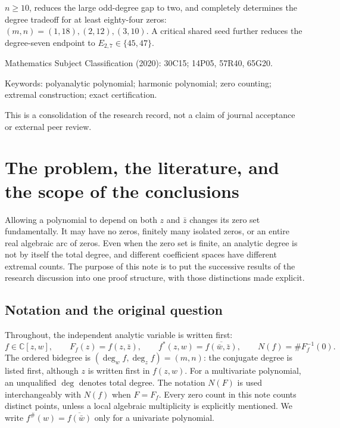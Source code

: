 \documentclass[UTF8,11pt]{ctexart}
\theoremstyle{definition}
\numberwithin{equation}{section}
\newcommand{\C}{\mathbb C}\newcommand{\R}{\mathbb R}
\begin{document}
\begin{titlepage}
\begin{tcolorbox}[colback=MidnightBlue!4,colframe=MidnightBlue!50,sharp corners,boxrule=0.5pt,width=0.94\textwidth,fontupper=\small]
$n\ge10$, reduces the large odd-degree gap to two,
and completely determines the degree tradeoff for at least
eighty-four zeros: $(m,n)=(1,18),(2,12),(3,10)$.
A critical shared seed further reduces the degree-seven
endpoint to $E_{2,7}\in\{45,47\}$.
\end{tcolorbox}
\vspace{0.6cm}
{\small Mathematics Subject Classification (2020): 30C15; 14P05, 57R40, 65G20.\par}
{\small Keywords: polyanalytic polynomial; harmonic polynomial; zero counting; extremal construction; exact certification.\par}
\vfill
{\small This is a consolidation of the research record, not a claim of journal acceptance or external peer review.\par}
\end{titlepage}
\begingroup\small\setlength{\parskip}{0pt}\linespread{0.93}\selectfont\tableofcontents\endgroup
\newpage
\section{The problem, the literature, and the scope of the conclusions}\label{sec:intro}

Allowing a polynomial to depend on both $z$ and $\bar z$ changes its zero set fundamentally. It may have no zeros, finitely many isolated zeros, or an entire real algebraic arc of zeros. Even when the zero set is finite, an analytic degree is not by itself the total degree, and different coefficient spaces have different extremal counts. The purpose of this note is to put the successive results of the research discussion into one proof structure, with those distinctions made explicit.

\subsection{Notation and the original question}\label{sec:notation}
Throughout, the independent analytic variable is written first:
\[
 f\in\C[z,w],\qquad F_f(z)=f(z,\bar z),\qquad
 f^*(z,w)=\overline{f(\bar w,\bar z)},\qquad N(f)=\#F_f^{-1}(0).
\]
The ordered bidegree is $(\deg_w f,\deg_z f)=(m,n)$: the conjugate degree is listed first, although $z$ is written first in $f(z,w)$. For a multivariate polynomial, an unqualified $\deg$ denotes total degree. The notation $N(F)$ is used interchangeably with $N(f)$ when $F=F_f$. Every zero count in this note counts distinct points, unless a local algebraic multiplicity is explicitly mentioned. We write $f^\#(w)=\overline{f(\bar w)}$ only for a univariate polynomial.
\end{document}
